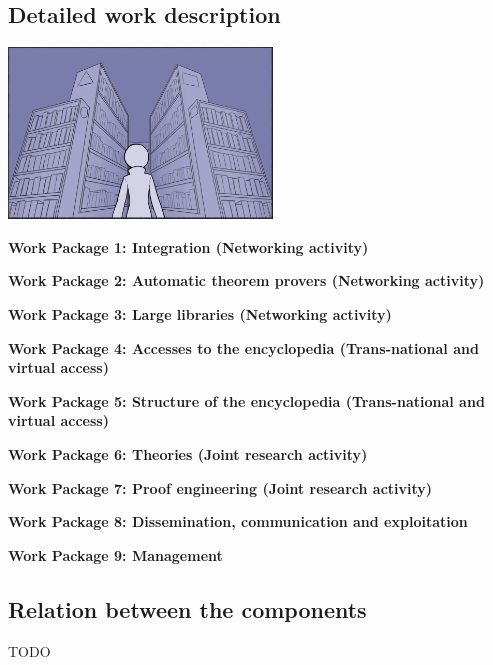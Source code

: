 \subsection{Detailed work description}

\begin{center}
\includegraphics[width=7cm]{Illustration4_Color.jpg}
\end{center}

\begin{workplan}


  \newcommand\na{(Networking activity)}
  \newcommand\tnva{(Trans-national and virtual access)}
  \newcommand\jra{(Joint research activity)}
  \newcommand\titlewp[3]{\bigskip\noindent\colorbox{color3}{\begin{minipage}\textwidth\bf Work Package #1: #2\end{minipage}}}

\titlewp{1}{Integration \na}{instrumentation}

\titlewp{2}{Automatic theorem provers \na}{atpetc}

\titlewp{3}{Large libraries \na}{libraries}

\titlewp{4}{Accesses to the encyclopedia \tnva}{access}

\titlewp{5}{Structure of the encyclopedia \tnva}{structuring}

\titlewp{6}{Theories \jra}{theories}

\titlewp{7}{Proof engineering \jra}{alignment}

\titlewp{8}{Dissemination, communication and exploitation}{dissemination}

\titlewp{9}{Management}{management}

\end{workplan}



\subsection{Relation between the components}

{\color{red} TODO}

